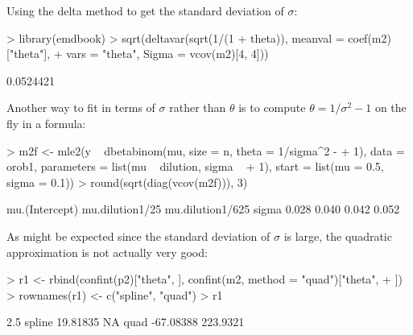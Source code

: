 \documentclass{article}
\begin{document}
Using the delta method to get the standard deviation of
$\sigma$:
\begin{Schunk}
\begin{Sinput}
> library(emdbook)
> sqrt(deltavar(sqrt(1/(1 + theta)), meanval = coef(m2)["theta"], 
+     vars = "theta", Sigma = vcov(m2)[4, 4]))
\end{Sinput}
\begin{Soutput}
[1] 0.0524421
\end{Soutput}
\end{Schunk}

Another way to fit in terms of $\sigma$ rather than $\theta$
is to compute $\theta=1/\sigma^2-1$ on the fly in a
formula:

\begin{Schunk}
\begin{Sinput}
> m2f <- mle2(y ~ dbetabinom(mu, size = n, theta = 1/sigma^2 - 
+     1), data = orob1, parameters = list(mu ~ dilution, sigma ~ 
+     1), start = list(mu = 0.5, sigma = 0.1))
> round(sqrt(diag(vcov(m2f))), 3)
\end{Sinput}
\begin{Soutput}
  mu.(Intercept)  mu.dilution1/25 mu.dilution1/625            sigma 
           0.028            0.040            0.042            0.052 
\end{Soutput}
\end{Schunk}

As might be expected since the standard deviation
of $\sigma$ is large, the quadratic approximation is
not actually very good:

\begin{Schunk}
\begin{Sinput}
> r1 <- rbind(confint(p2)["theta", ], confint(m2, method = "quad")["theta", 
+     ])
> rownames(r1) <- c("spline", "quad")
> r1
\end{Sinput}
\begin{Soutput}
           2.5 %
spline  19.81835       NA
quad   -67.08388 223.9321
\end{Soutput}
\end{Schunk}
\end{document}
